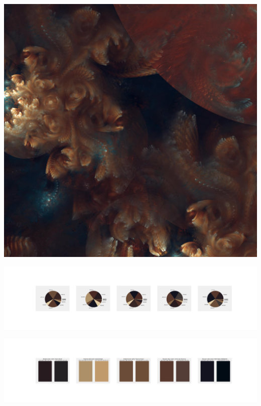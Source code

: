 \documentclass[11pt]{article}
\begin{document}
\begin{landscape}
    \begin{center}
    \includegraphics[width=\textwidth]{./nbimg/file (382).jpg}
    \end{center}

    \begin{center}
    \includegraphics[width=250mm]{./nbimg/pie-314.jpg}
    \end{center}

    \begin{center}
    \includegraphics[width=250mm]{./nbimg/peak-314.jpg}
    \end{center}
    


\end{landscape}
\end{document}
